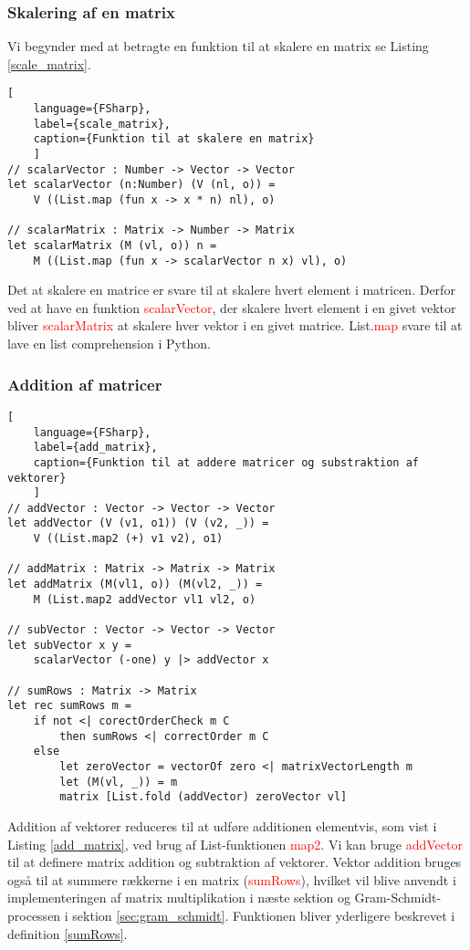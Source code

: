 \subsubsection{Skalering af en matrix}
Vi begynder med at betragte en funktion til at skalere en matrix se Listing \ref{scale_matrix}. 

\begin{lstlisting}[
    language={FSharp}, 
    label={scale_matrix}, 
    caption={Funktion til at skalere en matrix}
    ]
// scalarVector : Number -> Vector -> Vector
let scalarVector (n:Number) (V (nl, o)) = 
    V ((List.map (fun x -> x * n) nl), o)

// scalarMatrix : Matrix -> Number -> Matrix
let scalarMatrix (M (vl, o)) n = 
    M ((List.map (fun x -> scalarVector n x) vl), o)
\end{lstlisting}

Det at skalere en matrice er svare til at skalere hvert element i matricen. Derfor ved at have en funktion \textcolor{red}{scalarVector}, der skalere hvert element i en givet vektor bliver \textcolor{red}{scalarMatrix} at skalere hver vektor i en givet matrice. List.\textcolor{red}{map} svare til at lave en list comprehension i Python.


\subsubsection{Addition af matricer}
\begin{lstlisting}[
    language={FSharp}, 
    label={add_matrix}, 
    caption={Funktion til at addere matricer og substraktion af vektorer}
    ]
// addVector : Vector -> Vector -> Vector
let addVector (V (v1, o1)) (V (v2, _)) =
    V ((List.map2 (+) v1 v2), o1)

// addMatrix : Matrix -> Matrix -> Matrix
let addMatrix (M(vl1, o)) (M(vl2, _)) =
    M (List.map2 addVector vl1 vl2, o)

// subVector : Vector -> Vector -> Vector
let subVector x y =
    scalarVector (-one) y |> addVector x
    
// sumRows : Matrix -> Matrix
let rec sumRows m = 
    if not <| corectOrderCheck m C 
        then sumRows <| correctOrder m C
    else
        let zeroVector = vectorOf zero <| matrixVectorLength m
        let (M(vl, _)) = m
        matrix [List.fold (addVector) zeroVector vl]
\end{lstlisting}

Addition af vektorer reduceres til at udføre additionen elementvis, som vist i Listing \ref{add_matrix}, ved brug af List-funktionen \textcolor{red}{map2}. Vi kan bruge \textcolor{red}{addVector} til at definere matrix addition og subtraktion af vektorer. Vektor addition bruges også til at summere rækkerne i en matrix (\textcolor{red}{sumRows}), hvilket vil blive anvendt i implementeringen af matrix multiplikation i næste sektion og Gram-Schmidt-processen i sektion \ref{sec:gram_schmidt}. Funktionen bliver yderligere beskrevet i definition \ref{sumRows}.

